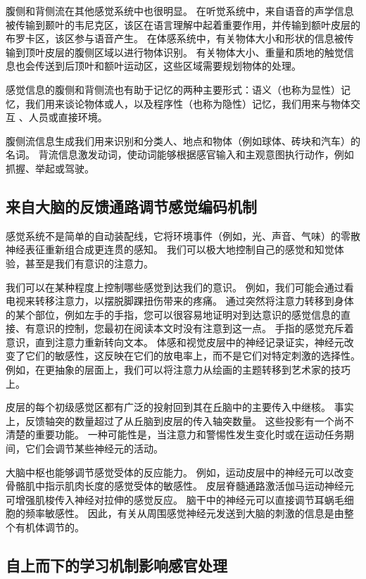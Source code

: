 腹侧和背侧流在其他感觉系统中也很明显。 
在听觉系统中，来自语音的声学信息被传输到颞叶的韦尼克区，该区在语言理解中起着重要作用，并传输到额叶皮层的布罗卡区，该区参与语音产生。 
在体感系统中，有关物体大小和形状的信息被传输到顶叶皮层的腹侧区域以进行物体识别。 
有关物体大小、重量和质地的触觉信息也会传送到后顶叶和额叶运动区，这些区域需要规划物体的处理。


感觉信息的腹侧和背侧流也有助于记忆的两种主要形式：语义（也称为显性）记忆，我们用来谈论物体或人，以及程序性（也称为隐性）记忆，我们用来与物体交互 、人员或直接环境。


腹侧流信息生成我们用来识别和分类人、地点和物体（例如球体、砖块和汽车）的名词。 
背流信息激发动词，使动词能够根据感官输入和主观意图执行动作，例如抓握、举起或驾驶。



\subsection{来自大脑的反馈通路调节感觉编码机制}

感觉系统不是简单的自动装配线，它将环境事件（例如，光、声音、气味）的零散神经表征重新组合成更连贯的感知。 
我们可以极大地控制自己的感觉和知觉体验，甚至是我们有意识的注意力。


我们可以在某种程度上控制哪些感觉到达我们的意识。 
例如，我们可能会通过看电视来转移注意力，以摆脱脚踝扭伤带来的疼痛。 
通过突然将注意力转移到身体的某个部位，例如左手的手指，您可以很容易地证明对到达意识的感觉信息的直接、有意识的控制，您最初在阅读本文时没有注意到这一点。 
手指的感觉充斥着意识，直到注意力重新转向文本。 
体感和视觉皮层中的神经记录证实，神经元改变了它们的敏感性，这反映在它们的放电率上，而不是它们对特定刺激的选择性。 
例如，在更抽象的层面上，我们可以将注意力从绘画的主题转移到艺术家的技巧上。


皮层的每个初级感觉区都有广泛的投射回到其在丘脑中的主要传入中继核。 
事实上，反馈轴突的数量超过了从丘脑到皮层的传入轴突数量。 
这些投影有一个尚不清楚的重要功能。 
一种可能性是，当注意力和警惕性发生变化时或在运动任务期间，它们会调节某些神经元的活动。


大脑中枢也能够调节感觉受体的反应能力。 
例如，运动皮层中的神经元可以改变骨骼肌中指示肌肉长度的感觉受体的敏感性。 
皮层脊髓通路激活伽马运动神经元可增强肌梭传入神经对拉伸的感觉反应。 
脑干中的神经元可以直接调节耳蜗毛细胞的频率敏感性。 
因此，有关从周围感觉神经元发送到大脑的刺激的信息是由整个有机体调节的。



\subsection{自上而下的学习机制影响感官处理}

